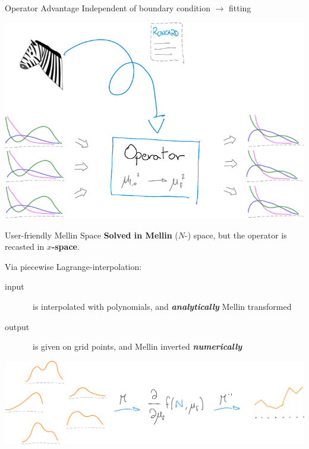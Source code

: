 \documentclass[9pt]{beamer}
\begin{document}
\begin{frame}{Operator Advantage}
    \vspace*{15pt}
    Independent of boundary condition $\to$ \pdf{} fitting

    \vspace*{25pt}
    \begin{center}
            \includegraphics[width=0.7\linewidth]{compute-ev-op-zebra}
    \end{center}
\end{frame}

\begin{frame}{User-friendly Mellin Space}
    \vspace*{15pt}
    \textbf{Solved in Mellin} ($N$-) space, but the operator is recasted in
    \textbf{$x$-space}.

    \vspace*{15pt}
     Via piecewise Lagrange-interpolation:
     \begin{description}
         \item[input] \pdf\ is interpolated with polynomials, and
             \textit{\textbf{analytically}} Mellin transformed
         \item[output] \pdf\ is given on grid points, and Mellin inverted
             \textit{\textbf{numerically}}
     \end{description}

    \vspace*{25pt}
    \begin{center}
            \includegraphics[width=0.9\linewidth]{mellin}
    \end{center}
\end{frame}
\end{document}
